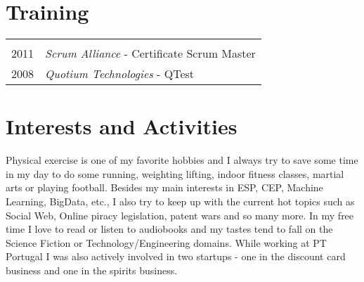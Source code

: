 \documentclass[a4paper,10pt]{article}
\begin{document}
\section{Training}
\begin{tabular}{rl}
\multicolumn{2}{c}{} \\
 2011 & \emph{Scrum Alliance} - Certificate Scrum Master  \\
 2008 & \emph{Quotium Technologies} - QTest \\
\end{tabular}

\section{Interests and Activities}
Physical exercise is one of my favorite hobbies and I always try to save some time
in my day to do some running, weighting lifting, indoor fitness classes, martial arts
or playing football. Besides my main interests in ESP, CEP, Machine Learning,
BigData, etc., I also try to keep up with the current hot topics such as Social Web,
Online piracy legislation, patent wars and so many more. In my free time I love
to read or listen to audiobooks and my tastes tend to fall on the Science Fiction
or Technology/Engineering domains. While working at PT Portugal I was also
actively involved in two startups - one in the discount card business and one in the
spirits business.
\end{document}
